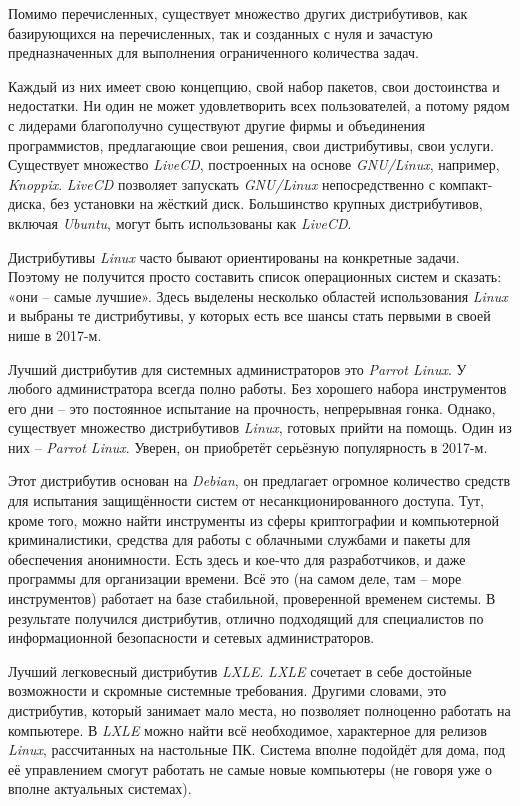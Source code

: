Помимо перечисленных, существует множество других дистрибутивов, как базирующихся на перечисленных, так и созданных с нуля и зачастую предназначенных для выполнения ограниченного количества задач.

Каждый из них имеет свою концепцию, свой набор пакетов, свои достоинства и недостатки. Ни один не может удовлетворить всех пользователей, а потому рядом с лидерами благополучно существуют другие фирмы и объединения программистов, предлагающие свои решения, свои дистрибутивы, свои услуги. Существует множество \textit{LiveCD}, построенных на основе \textit{GNU/Linux}, например, \textit{Knoppix}. \textit{LiveCD} позволяет запускать\textit{ GNU/Linux} непосредственно с компакт-диска, без установки на жёсткий диск. Большинство крупных дистрибутивов, включая \textit{Ubuntu}, могут быть использованы как \textit{LiveCD}.

Дистрибутивы \textit{Linux} часто бывают ориентированы на конкретные задачи. Поэтому не получится просто составить список операционных систем и сказать: «они – самые лучшие». Здесь выделены несколько областей использования \textit{Linux} и выбраны те дистрибутивы, у которых есть все шансы стать первыми в своей нише в 2017-м.~\cite{linuxDistr}

Лучший дистрибутив для системных администраторов это \textit{Parrot Linux}. У любого администратора всегда полно работы. Без хорошего набора инструментов его дни – это постоянное испытание на прочность, непрерывная гонка. Однако, существует множество дистрибутивов \textit{Linux}, готовых прийти на помощь. Один из них – \textit{Parrot Linux}. Уверен, он приобретёт серьёзную популярность в 2017-м.

Этот дистрибутив основан на \textit{Debian}, он предлагает огромное количество средств для испытания защищённости систем от несанкционированного доступа. Тут, кроме того, можно найти инструменты из сферы криптографии и компьютерной криминалистики, средства для работы с облачными службами и пакеты для обеспечения анонимности. Есть здесь и кое-что для разработчиков, и даже программы для организации времени. Всё это (на самом деле, там – море инструментов) работает на базе стабильной, проверенной временем системы. В результате получился дистрибутив, отлично подходящий для специалистов по информационной безопасности и сетевых администраторов.

Лучший легковесный дистрибутив \textit{LXLE}.  \textit{LXLE} сочетает в себе достойные возможности и скромные системные требования. Другими словами, это дистрибутив, который занимает мало места, но позволяет полноценно работать на компьютере. В \textit{LXLE} можно найти всё необходимое, характерное для релизов \textit{Linux}, рассчитанных на настольные ПК. Система вполне подойдёт для дома, под её управлением смогут работать не самые новые компьютеры (не говоря уже о вполне актуальных системах).

